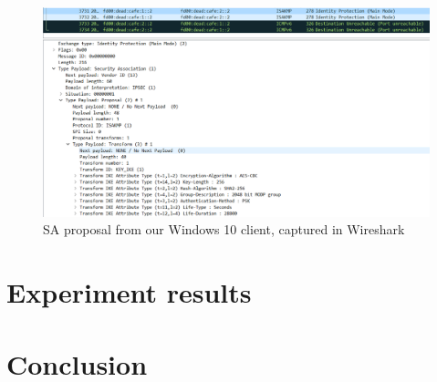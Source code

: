 \documentclass[a4paper]{report}
\begin{document}
\begin{figure}[htb]
	\includegraphics[width=\linewidth]{IPsec_Proposal_Win10_client.png}
	\caption{SA proposal from our Windows 10 client, captured in Wireshark}
	\label{fig:FirstSAProposal}
\end{figure}



\section{Experiment results}
\label{sec:ExpRes}

\section{Conclusion}
\label{sec:Conc}

\newpage

\printbibliography
\end{document}
